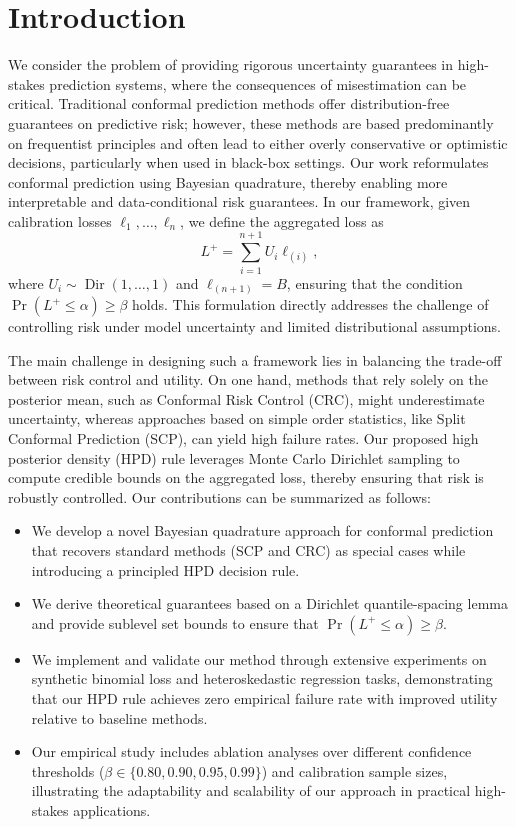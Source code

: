 \documentclass{article}
\begin{document}
\section{Introduction}
We consider the problem of providing rigorous uncertainty guarantees in high-stakes prediction systems, where the consequences of misestimation can be critical. Traditional conformal prediction methods offer distribution-free guarantees on predictive risk; however, these methods are based predominantly on frequentist principles and often lead to either overly conservative or optimistic decisions, particularly when used in black-box settings. Our work reformulates conformal prediction using Bayesian quadrature, thereby enabling more interpretable and data-conditional risk guarantees. In our framework, given calibration losses $\ell_1, \dots, \ell_n$, we define the aggregated loss as 
\[
L^+ = \sum_{i=1}^{n+1} U_i \ell_{(i)},
\]
where $U_i \sim \operatorname{Dir}(1,\dots,1)$ and $\ell_{(n+1)} = B$, ensuring that the condition $\Pr(L^+ \leq \alpha) \geq \beta$ holds. This formulation directly addresses the challenge of controlling risk under model uncertainty and limited distributional assumptions.

The main challenge in designing such a framework lies in balancing the trade-off between risk control and utility. On one hand, methods that rely solely on the posterior mean, such as Conformal Risk Control (CRC), might underestimate uncertainty, whereas approaches based on simple order statistics, like Split Conformal Prediction (SCP), can yield high failure rates. Our proposed high posterior density (HPD) rule leverages Monte Carlo Dirichlet sampling to compute credible bounds on the aggregated loss, thereby ensuring that risk is robustly controlled. Our contributions can be summarized as follows:
\begin{itemize}
    \item We develop a novel Bayesian quadrature approach for conformal prediction that recovers standard methods (SCP and CRC) as special cases while introducing a principled HPD decision rule.
    \item We derive theoretical guarantees based on a Dirichlet quantile-spacing lemma and provide sublevel set bounds to ensure that $\Pr(L^+ \leq \alpha) \geq \beta$.
    \item We implement and validate our method through extensive experiments on synthetic binomial loss and heteroskedastic regression tasks, demonstrating that our HPD rule achieves zero empirical failure rate with improved utility relative to baseline methods.
    \item Our empirical study includes ablation analyses over different confidence thresholds ($\beta \in \{0.80, 0.90, 0.95, 0.99\}$) and calibration sample sizes, illustrating the adaptability and scalability of our approach in practical high-stakes applications.
\end{itemize}
\end{document}

